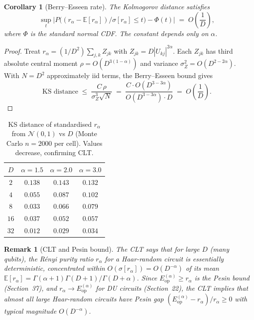 \documentclass[12pt,a4paper]{article}
\newtheorem{corollary}[theorem]{Corollary}
\newtheorem{remark}[theorem]{Remark}
\begin{document}
\begin{corollary}[Berry--Esseen rate]\label{cor:berry_esseen}
The Kolmogorov distance satisfies
\[
  \sup_t\bigl|P\!\bigl((r_\alpha-\mathbb{E}[r_\alpha])/\sigma[r_\alpha]\leq t\bigr)-\Phi(t)\bigr|
  \;=\;O\!\left(\frac{1}{D}\right),
\]
where $\Phi$ is the standard normal CDF.  The constant depends only on $\alpha$.
\end{corollary}

\begin{proof}
Treat $r_\alpha=(1/D^2)\sum_{j,k}Z_{jk}$ with $Z_{jk}=D|U_{kj}|^{2\alpha}$.
Each $Z_{jk}$ has third absolute central moment $\rho=O(D^{3(1-\alpha)})$
and variance $\sigma_Z^2=O(D^{2-2\alpha})$.  With $N=D^2$ approximately iid terms,
the Berry--Esseen bound gives
\[
  \text{KS distance}\;\leq\;\frac{C\,\rho}{\sigma_Z^3\sqrt{N}}
  \;=\;\frac{C\cdot O(D^{3-3\alpha})}{O(D^{3-3\alpha})\cdot D}\;=\;O\!\left(\frac{1}{D}\right).
\]
\end{proof}

\begin{table}[h]
\centering
\caption{KS distance of standardised $r_\alpha$ from $\mathcal N(0,1)$ vs $D$
(Monte Carlo $n=2000$ per cell). Values decrease, confirming CLT.}
\label{tab:clt_ks}
\begin{tabular}{c|ccc}
\hline
$D$ & $\alpha=1.5$ & $\alpha=2.0$ & $\alpha=3.0$ \\
\hline
$2$  & $0.138$ & $0.143$ & $0.132$ \\
$4$  & $0.055$ & $0.087$ & $0.102$ \\
$8$  & $0.033$ & $0.066$ & $0.079$ \\
$16$ & $0.037$ & $0.052$ & $0.057$ \\
$32$ & $0.012$ & $0.029$ & $0.034$ \\
\hline
\end{tabular}
\end{table}

\begin{remark}[CLT and Pesin bound]\label{rem:clt_pesin}
The CLT says that for large $D$ (many qubits), the Rényi purity ratio $r_\alpha$ for a
Haar-random circuit is essentially deterministic, concentrated within $O(\sigma[r_\alpha])=
O(D^{-\alpha})$ of its mean $\mathbb{E}[r_\alpha]=\Gamma(\alpha+1)\Gamma(D+1)/\Gamma(D+\alpha)$.
Since $E_\mathrm{op}^{(\alpha)}\geq r_\alpha$ is the Pesin bound (Section~37), and
$r_\alpha\to E_\mathrm{op}^{(\alpha)}$ for DU circuits (Section~22), the CLT implies
that almost all large Haar-random circuits have Pesin gap
$(E_\mathrm{op}^{(\alpha)}-r_\alpha)/r_\alpha\geq0$ with typical magnitude $O(D^{-\alpha})$.
\end{remark}
\end{document}
